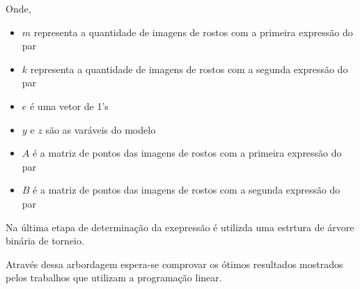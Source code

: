 Onde, 
\begin{itemize}
\item \textbf {$m$} representa a quantidade de imagens de rostos com a primeira expressão do par
\item \textbf {$k$} representa a quantidade de imagens de rostos com a segunda expressão do par
\item \textbf {$e$} é uma vetor de 1's
\item \textbf {$y$} e {$z$} são as varáveis do modelo
\item \textbf {$A$} é a matriz de pontos das imagens de rostos com a primeira expressão do par
\item \textbf {$B$} é a matriz de pontos das imagens de rostos com a segunda expressão do par
\end{itemize}

Na última etapa de determinação da exepressão é utilizda uma estrtura de árvore binária de torneio.

Através dessa arbordagem espera-se comprovar os ótimos resultados mostrados pelos trabalhos que utilizam a programação linear.

